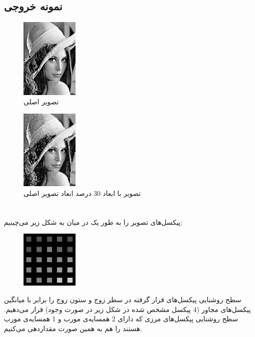 \documentclass{article}
\begin{document}
\subsection{}
\begin{latin}

\end{latin}
\subsection{نمونه خروجی}
\begin{figure}[H]
    \centering
    \includegraphics[width=0.25\textwidth]{figures/4a.jpg}
    \caption
	{
تصویر اصلی
	}
    \label{fig:fig1}
\end{figure}
\begin{figure}[H]
    \centering
    \includegraphics[width=0.25\textwidth]{figures/4b.jpg}
    \caption
	{
تصویر با ابعاد 30 درصد ابعاد تصویر اصلی
	}
    \label{fig:fig1}
\end{figure}


\section{}%
پیکسل‌های تصویر را به طور یک در میان به شکل زیر می‌چینیم:
\begin{figure}[H]
    \centering
    \includegraphics[width=0.25\textwidth]{figures/5a.jpg}
    \caption
	{}
    \label{fig:fig1}
\end{figure}
سطح روشنایی پیکسل‌های قرار گرفته در سطر زوج و ستون زوج را برابر با میانگین پیکسل‌های مجاور (4 پیکسل مشخص شده در شکل زیر در صورت وجود) قرار می‌دهیم. سطح روشنایی پیکسل‌های مرزی که دارای 2 همسایه‌ی مورب و 1 همسایه‌ی مورب هستند را هم به همین صورت مقداردهی می‌کنیم.
\end{document}
